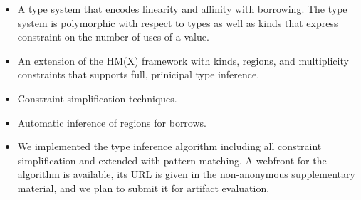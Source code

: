 \begin{itemize}
\item A type system that encodes linearity and affinity with
  borrowing. The type system is polymorphic with respect to types as
  well as kinds that express constraint on the number of uses of a value.
\item An extension of the HM(X) framework
  \cite{DBLP:journals/tapos/OderskySW99} with kinds, regions, and
  multiplicity constraints that supports full, prinicipal type inference.
\item Constraint simplification techniques.
\item Automatic inference of regions for borrows.
\item We implemented the type inference algorithm including all
  constraint simplification and extended with pattern matching. A
  webfront for the algorithm is available, its URL is given in the
  non-anonymous supplementary material, and we plan to submit it for
  artifact evaluation.
\end{itemize}

